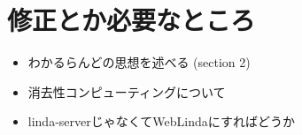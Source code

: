 \section*{修正とか必要なところ}

\begin{itemize}
  \item わかるらんどの思想を述べる (section 2)
  \item 消去性コンピューティングについて\cite{kurihara2016}
  \item linda-serverじゃなくてWebLindaにすればどうか
\end{itemize}
